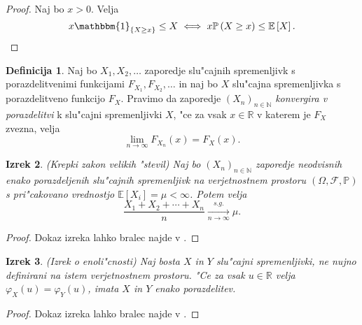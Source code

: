 \documentclass[12pt, a4paper, reqno]{amsart}
\theoremstyle{definition}
\newtheorem{definicija}{Definicija}[section]
\theoremstyle{plain}
\newtheorem{izrek}[definicija]{Izrek}
\newcommand{\R}{\mathbb{R}}
\newcommand{\N}{\mathbb{N}}
\newcommand{\E}{\mathbb{E}}
\newcommand{\Prob}{\mathbb{P}}
\newcommand{\1}{\mathds{1}}
\begin{document}
    \begin{proof}
        Naj bo $x > 0$. Velja
        \begin{equation*}
            x\mathbbm{1}_{\{X \geq x\}} \leq X \iff x\Prob\left(X \geq x\right) \leq \E\left[X\right].
        \end{equation*}
    \end{proof}

    \begin{definicija}
        Naj bo $X_1, X_2, \dots$ zaporedje slu"cajnih spremenljivk s porazdelitvenimi funkcijami
        $F_{X_1}, F_{X_2}, \dots$ in naj bo $X$ slu"cajna spremenljivka s porazdelitveno funkcijo $F_X$.
        Pravimo da zaporedje $(X_n)_{n\in\N}$ \textit{konvergira v porazdelitvi} k slu"cajni spremenljivki $X$,
        "ce za vsak $x\in\R$ v katerem je $F_X$ zvezna, velja
        \begin{equation*}
            \lim_{n\to\infty}F_{X_n}(x) = F_X(x).
        \end{equation*}
        \label{def:KonvergencaVPorazdelitvi}
    \end{definicija}

    \begin{izrek}(Krepki zakon velikih "stevil)
        Naj bo $(X_n)_{n\in\N}$ zaporedje neodvisnih enako porazdeljenih
        slu"cajnih spremenljivk na verjetnostnem prostoru $(\Omega, \mathcal{F}, \Prob)$
         s pri"cakovano vrednostjo $\E\left[X_i\right] = \mu <\infty$. Potem velja
        \begin{equation*}
            \frac{X_1 + X_2 + \cdots + X_n}{n}\xrightarrow[n\to\infty]{s.g.} \mu.
        \end{equation*}
        \label{izr:KrepkiZakonVelikihStevil}
    \end{izrek}

    \begin{proof}
        Dokaz izreka lahko bralec najde v \cite{7}.
    \end{proof}

    \begin{izrek}(Izrek o enoli"cnosti)
        Naj bosta $X$ in $Y$ slu"cajni spremenljivki, ne nujno definirani na istem verjetnostnem prostoru.
        "Ce za vsak $u\in\R$ velja $\varphi_X(u) = \varphi_Y(u)$, imata $X$ in $Y$ enako porazdelitev.
        \label{izr:enolicnost}
    \end{izrek}

    \begin{proof}
        Dokaz izreka lahko bralec najde v \cite{7}.
    \end{proof}
\end{document}
